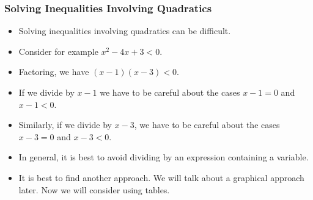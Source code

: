 \documentclass[serif,ignorenonframetext]{beamer}
\begin{document}

\begin{frame}
  \frametitle{Solving Inequalities Involving Quadratics}
  \begin{itemize}[<+->]
  \item Solving inequalities involving quadratics can be difficult.
  \item Consider for example $x^2-4x+3<0$.
  \item Factoring, we have $(x-1)(x-3)<0$.
  \item If we divide by $x-1$ we have to be careful about the cases
    $x-1=0$ and $x-1<0$.
  \item Similarly, if we divide by $x-3$, we have to be careful about
    the cases $x-3=0$ and $x-3<0$.
  \item In general, it is best to avoid dividing by an expression containing
    a variable.
  \item It is best to find another approach.  We will talk about a graphical
    approach later.  Now we will consider using tables.
  \end{itemize}
\end{frame}
\end{document}
